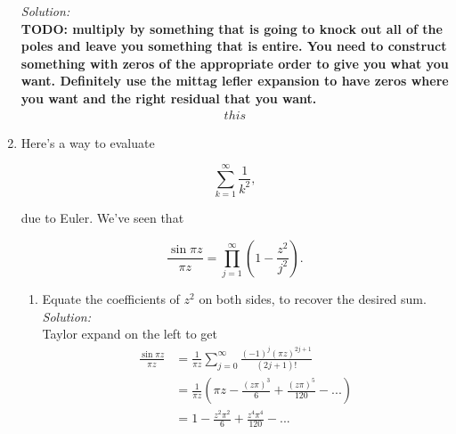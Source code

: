 \documentclass[10pt]{amsart}
\theoremstyle{nonumberplain}
\begin{document}
\begin{enumerate}[label={\bf {\arabic*}:}]
\noindent
\textit{Solution:} \\
\textbf{TODO: multiply by something that is going to knock out all of the poles and leave you something that is entire. You need to construct something with zeros of the appropriate order to give you what you want. Definitely use the mittag lefler expansion to have zeros where you want and the right residual that you want.}
\begin{align*}
this
\end{align*}

\newpage

\item Here's a way to evaluate

$$
\sum_{k=1}^{\infty} \frac{1}{k^2},
$$

due to Euler. We've seen that

$$
\frac{\sin \pi z}{\pi z} = \prod_{j=1}^{\infty}\left(1-\frac{z^2}{j^2}\right) .
$$

\begin{enumerate}
\item Equate the coefficients of $z^2$ on both sides, to recover the desired sum. \\

\noindent
\textit{Solution:} \\
Taylor expand on the left to get
\begin{align*}
\frac{\sin \pi z}{\pi z} &= \frac 1 {\pi z} \sum_{j=0}^\infty \frac {(-1)^j (\pi z)^{2j + 1}}{(2j + 1)!} \\
	&= \frac 1 {\pi z} \left(\pi z -\frac {(z \pi)^3}{6} + \frac{(z \pi)^5}{120} - ... \right) \\
	&= 1 -\frac {z^2 \pi^2}{6} + \frac{z^4 \pi^4}{120} - ... 
\end{align*}


\end{enumerate}
\end{enumerate}
\end{document}
